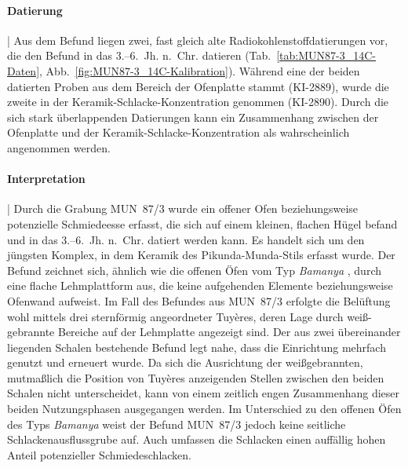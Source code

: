\paragraph{Datierung}\hspace{-.5em}|\hspace{.5em}%
Aus dem Befund liegen zwei, fast gleich alte Radiokohlenstoffdatierungen vor, die den Befund in das 3.--6.~Jh. n.~Chr. datieren (Tab.~\ref{tab:MUN87-3_14C-Daten}, Abb.~\ref{fig:MUN87-3_14C-Kalibration}). Während eine der beiden datierten Proben aus dem Bereich der Ofenplatte stammt (KI-2889), wurde die zweite in der Keramik-Schlacke-Konzentration genommen (KI-2890). Durch die sich stark überlappenden Datierungen kann ein Zusammenhang zwischen der Ofenplatte und der Keramik-Schlacke-Konzentration als wahrscheinlich angenommen werden. 

\paragraph{Interpretation}\hspace{-.5em}|\hspace{.5em}%
Durch die Grabung MUN~87/3 wurde ein offener Ofen beziehungsweise potenzielle Schmiedeesse erfasst, die sich auf einem kleinen, flachen Hügel befand und in das 3.--6.~Jh. n.~Chr. datiert werden kann. Es handelt sich um den jüngsten Komplex, in dem Keramik des Pikunda-Munda-Stils erfasst wurde. Der Befund zeichnet sich, ähnlich wie die offenen Öfen vom Typ \textit{Bamanya} \parencite[3235--3237]{Eggert.1987}, durch eine flache Lehmplattform aus, die keine aufgehenden Elemente beziehungsweise Ofenwand aufweist. Im Fall des Befundes aus MUN~87/3 erfolgte die Belüftung wohl mittels drei sternförmig angeordneter Tuyères, deren Lage durch weiß-gebrannte Bereiche auf der Lehmplatte angezeigt sind. Der aus zwei übereinander liegenden Schalen bestehende Befund legt nahe, dass die Einrichtung mehrfach genutzt und erneuert wurde. Da sich die Ausrichtung der weißgebrannten, mutmaßlich die Position von Tuyères anzeigenden Stellen zwischen den beiden Schalen nicht unterscheidet, kann von einem zeitlich engen Zusammenhang dieser beiden Nutzungsphasen ausgegangen werden. Im Unterschied zu den offenen Öfen des Typs \textit{Bamanya} weist der Befund MUN~87/3 jedoch keine seitliche Schlackenausflussgrube auf. Auch umfassen die Schlacken einen auffällig hohen Anteil potenzieller Schmiedeschlacken.
